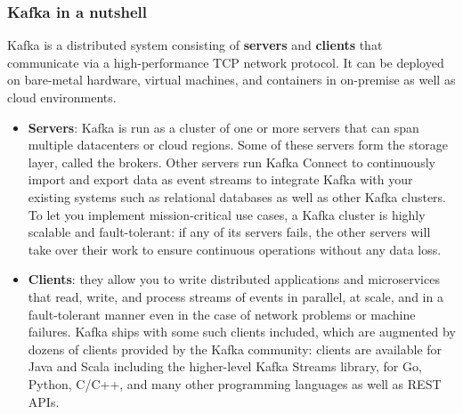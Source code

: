 \documentclass[10pt,a4paper]{article}
\begin{document}
\subsubsection{Kafka in a nutshell}
Kafka is a distributed system consisting of \textbf{servers} and \textbf{clients} that communicate via a high-performance TCP network protocol. It can be deployed on bare-metal hardware, virtual machines, and containers in on-premise as well as cloud environments. 
\begin{itemize}
	\item \textbf{Servers}: Kafka is run as a cluster of one or more servers that can span multiple datacenters or cloud regions. Some of these servers form the storage layer, called the brokers. Other servers run Kafka Connect to continuously import and export data as event streams to integrate Kafka with your existing systems such as relational databases as well as other Kafka clusters. To let you implement mission-critical use cases, a Kafka cluster is highly scalable and fault-tolerant: if any of its servers fails, the other servers will take over their work to ensure continuous operations without any data loss.
	\item \textbf{Clients}: they allow you to write distributed applications and microservices that read, write, and process streams of events in parallel, at scale, and in a fault-tolerant manner even in the case of network problems or machine failures. Kafka ships with some such clients included, which are augmented by dozens of clients provided by the Kafka community: clients are available for Java and Scala including the higher-level Kafka Streams library, for Go, Python, C/C++, and many other programming languages as well as REST APIs.
\end{itemize}
\end{document}
